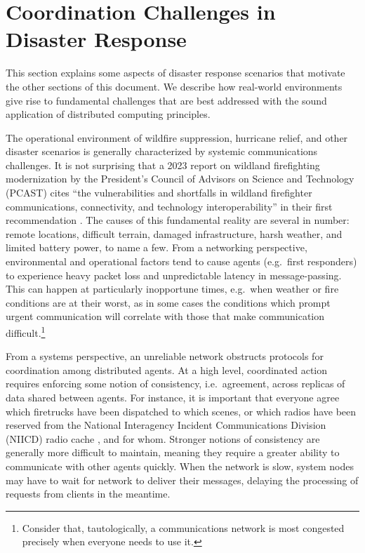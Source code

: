 \documentclass[]             %
{NASA}                       %
\theoremstyle{definition}
\begin{document}
\section{Coordination Challenges in Disaster
Response}\label{coordination-challenges-in-disaster-response}

\label{sec:disaster-response}

This section explains some aspects of disaster response scenarios that
motivate the other sections of this document. We describe how real-world
environments give rise to fundamental challenges that are best addressed
with the sound application of distributed computing principles.

The operational environment of wildfire suppression, hurricane relief,
and other disaster scenarios is generally characterized by systemic
communications challenges. It is not surprising that a 2023 report on
wildland firefighting modernization by the President’s Council of
Advisors on Science and Technology (PCAST) cites ``the
vulnerabilities and shortfalls in wildland firefighter communications,
connectivity, and technology interoperability'' in their first
recommendation \cite{pcast2023}. The causes of this fundamental
reality are several in number: remote locations, difficult terrain,
damaged infrastructure, harsh weather, and limited battery power, to
name a few.  From a networking perspective, environmental and
operational factors tend to cause agents (e.g.~first responders) to
experience heavy packet loss and unpredictable latency in
message-passing. This can happen at particularly inopportune times,
e.g.~when weather or fire conditions are at their worst, as in some
cases the conditions which prompt urgent communication will correlate
with those that make communication difficult.\footnote{Consider that,
tautologically, a communications network is most \mbox{congested}
precisely when everyone needs to use it.}

From a systems perspective, an unreliable network obstructs protocols
for coordination among distributed agents. At a high level,
coordinated action requires enforcing some notion of consistency,
i.e.~agreement, across replicas of data shared between agents. For
instance, it is important that everyone agree which firetrucks have
been dispatched to which scenes, or which radios have been reserved
from the National Interagency Incident Communications Division (NIICD)
radio cache \cite{radiocache}, and for whom. Stronger notions of
consistency are generally more difficult to maintain, meaning they
require a greater ability to communicate with other agents
quickly. When the network is slow, system nodes may have to wait for
network to deliver their messages, delaying the processing of requests
from clients in the meantime.
\end{document}
